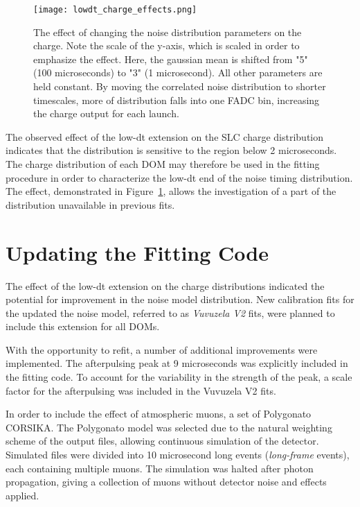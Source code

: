 \begin{figure}[h]
\centering
\texttt{[image: lowdt\_charge\_effects.png]} 
\caption{The effect of changing the noise distribution parameters on the charge. Note the scale of the y-axis, which is scaled in order to emphasize the effect. Here, the gaussian mean is shifted from "5" (100 microseconds) to "3" (1 microsecond). All other parameters are held constant. By moving the correlated noise distribution to shorter timescales, more of distribution falls into one FADC bin, increasing the charge output for each launch. }
\label{fig:lowdt_effect_charge}
\end{figure}

The observed effect of the low-dt extension on the SLC charge distribution indicates that the distribution is sensitive to the region below 2 microseconds.
The charge distribution of each DOM may therefore be used in the fitting procedure in order to characterize the low-dt end of the noise timing distribution.
The effect, demonstrated in Figure~\ref{fig:lowdt_effect_charge}, allows the investigation of a part of the distribution unavailable in previous fits.

\label{sec:vuvuzela_fitting}
\section{Updating the Fitting Code}
The effect of the low-dt extension on the charge distributions indicated the potential for improvement in the noise model distribution.
New calibration fits for the updated the noise model, referred to as \emph{Vuvuzela V2} fits, were planned to include this extension for all DOMs.

With the opportunity to refit, a number of additional improvements were implemented.
The afterpulsing peak at 9 microseconds was explicitly included in the fitting code.
To account for the variability in the strength of the peak, a scale factor for the afterpulsing was included in the Vuvuzela V2 fits.

In order to include the effect of atmospheric muons, a set of Polygonato CORSIKA.
The Polygonato model was selected due to the natural weighting scheme of the output files, allowing continuous simulation of the detector.
Simulated files were divided into 10 microsecond long events (\emph{long-frame} events), each containing multiple muons.
The simulation was halted after photon propagation, giving a collection of muons without detector noise and effects applied.

